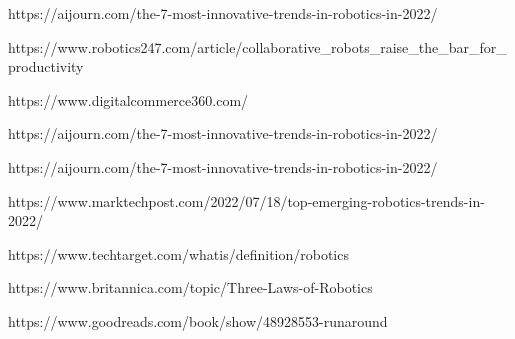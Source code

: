 \documentclass{report}
\begin{document}
\begin{thebibliography}{99}

https://aijourn.com/the-7-most-innovative-trends-in-robotics-in-2022/

https://www.robotics247.com/article/collaborative\_robots\_raise\_the\_bar\_for\_productivity

https://www.digitalcommerce360.com/

https://aijourn.com/the-7-most-innovative-trends-in-robotics-in-2022/

https://aijourn.com/the-7-most-innovative-trends-in-robotics-in-2022/

https://www.marktechpost.com/2022/07/18/top-emerging-robotics-trends-in-2022/

https://www.techtarget.com/whatis/definition/robotics

https://www.britannica.com/topic/Three-Laws-of-Robotics

https://www.goodreads.com/book/show/48928553-runaround

\end{thebibliography}
\end{document}
